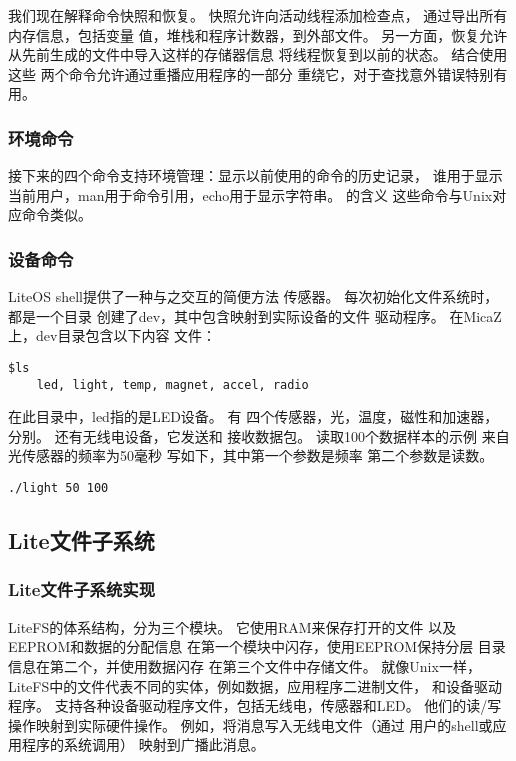 我们现在解释命令快照和恢复。
快照允许向活动线程添加检查点，
通过导出所有内存信息，包括变量
值，堆栈和程序计数器，到外部文件。
另一方面，恢复允许从先前生成的文件中导入这样的存储器信息
将线程恢复到以前的状态。 结合使用这些
两个命令允许通过重播应用程序的一部分
重绕它，对于查找意外错误特别有用。

\subsubsection{环境命令}
接下来的四个命令支持环境管理：显示以前使用的命令的历史记录，
谁用于显示当前用户，man用于命令引用，echo用于显示字符串。 的含义
这些命令与Unix对应命令类似。

\subsubsection{设备命令}
LiteOS shell提供了一种与之交互的简便方法
传感器。 每次初始化文件系统时，都是一个目录
创建了dev，其中包含映射到实际设备的文件
驱动程序。 在MicaZ上，dev目录包含以下内容
文件：
\begin{lstlisting}[language={[ANSI]C},keywordstyle=\color{blue!70},commentstyle=\color{red!50!green!50!blue!50},frame=shadowbox, rulesepcolor=\color{red!20!green!20!blue!20}]
    $ls
    led, light, temp, magnet, accel, radio
    \end{lstlisting}
在此目录中，led指的是LED设备。 有
四个传感器，光，温度，磁性和加速器，
分别。 还有无线电设备，它发送和
接收数据包。 读取100个数据样本的示例
来自光传感器的频率为50毫秒
写如下，其中第一个参数是频率
第二个参数是读数。
\begin{lstlisting}[language={[ANSI]C},keywordstyle=\color{blue!70},commentstyle=\color{red!50!green!50!blue!50},frame=shadowbox, rulesepcolor=\color{red!20!green!20!blue!20}]
    ./light 50 100
    \end{lstlisting}  


\subsection{Lite文件子系统}

\subsubsection{Lite文件子系统实现}
LiteFS的体系结构，分为三个模块。 它使用RAM来保存打开的文件
以及EEPROM和数据的分配信息
在第一个模块中闪存，使用EEPROM保持分层
目录信息在第二个，并使用数据闪存
在第三个文件中存储文件。 就像Unix一样，LiteFS中的文件代表不同的实体，例如数据，应用程序二进制文件，
和设备驱动程序。 支持各种设备驱动程序文件，包括无线电，传感器和LED。 他们的读/写
操作映射到实际硬件操作。 例如，将消息写入无线电文件（通过
用户的shell或应用程序的系统调用）
映射到广播此消息。


